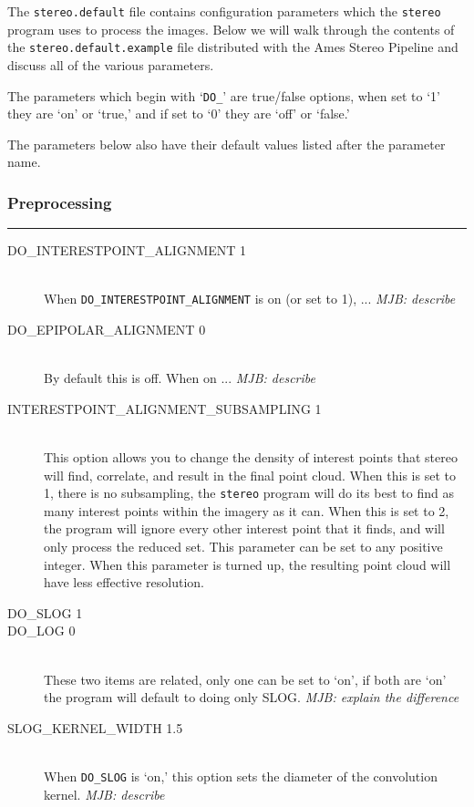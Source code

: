 The \texttt{stereo.default} file contains configuration parameters
which the \texttt{stereo} program uses to process the images.  Below
we will walk through the contents of the \texttt{stereo.default.example}
file distributed with the Ames Stereo Pipeline and discuss all of
the various parameters.

The parameters which begin with `\texttt{DO\_}' are true/false options,
when set to `1' they are `on' or `true,' and if set to `0' they are
`off' or `false.'

The parameters below also have their default values listed after
the parameter name.

\subsubsection*{Preprocessing}
\hrule
\bigskip

\begin{description}
\item[DO\_INTERESTPOINT\_ALIGNMENT 1] \hfill \\
When \texttt{DO\_INTERESTPOINT\_ALIGNMENT} is on (or set to 1), ... \emph{MJB: describe}

\item[DO\_EPIPOLAR\_ALIGNMENT 0] \hfill \\
By default this is off.  When on ... \emph{MJB: describe}

\item[INTERESTPOINT\_ALIGNMENT\_SUBSAMPLING 1] \hfill \\
This option allows you to change the density of interest points
that stereo will find, correlate, and result in the final point
cloud.  When this is set to 1, there is no subsampling, the
\texttt{stereo} program will do its best to find as many interest
points within the imagery as it can.  When this is set to 2, the
program will ignore every other interest point that it finds, and
will only process the reduced set.  This parameter can be set to
any positive integer.  When this parameter is turned up, the resulting
point cloud will have less effective resolution.

\item[DO\_SLOG 1]
\item[DO\_LOG 0] \hfill \\
These two items are related, only one can be set to `on', if both
are `on' the program will default to doing only SLOG.  \emph{MJB: explain the difference}

\item[SLOG\_KERNEL\_WIDTH 1.5] \hfill \\
When \texttt{DO\_SLOG} is `on,' this option sets the diameter of
the convolution kernel. \emph{MJB: describe}

\end{description}

